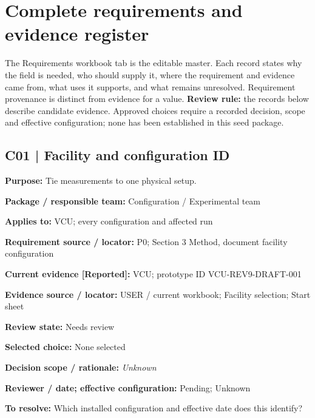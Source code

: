 \documentclass[11pt]{article}
\begin{document}
\clearpage\section{Complete requirements and evidence register}\label{requirements}
The Requirements workbook tab is the editable master. Each record states why the field is needed, who should supply it, where the requirement and evidence came from, what uses it supports, and what remains unresolved. Requirement provenance is distinct from evidence for a value.
\textbf{Review rule:} the records below describe candidate evidence. Approved choices require a recorded decision, scope and effective configuration; none has been established in this seed package.
\par\noindent\begin{minipage}{\textwidth}\small\setlength{\parskip}{2pt}
\subsection*{C01 | Facility and configuration ID}
\textbf{Purpose:} Tie measurements to one physical setup.\par
\textbf{Package / responsible team:} Configuration / Experimental team\par
\textbf{Applies to:} VCU; every configuration and affected run\par
\textbf{Requirement source / locator:} P0; Section 3 Method, document facility configuration\par
\textbf{Current evidence [Reported]:} VCU; prototype ID VCU-REV9-DRAFT-001\par
\textbf{Evidence source / locator:} USER / current workbook; Facility selection; Start sheet\par
\textbf{Review state:} Needs review\par
\textbf{Selected choice:} None selected\par
\textbf{Decision scope / rationale:} \textit{Unknown}\par
\textbf{Reviewer / date; effective configuration:} Pending; Unknown\par
\textbf{To resolve:} Which installed configuration and effective date does this identify?\par
\end{minipage}\par\vspace{5pt}
\end{document}
